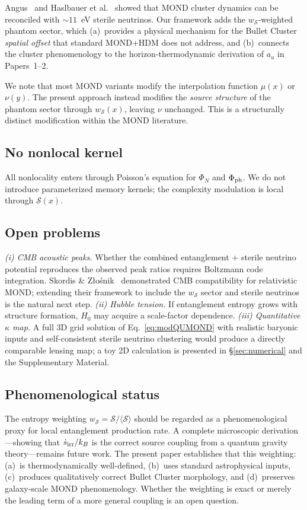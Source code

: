 \documentclass[aps,prd,twocolumn,superscriptaddress,nofootinbib]{revtex4-2}
\newcommand{\au}{a_u}
\newcommand{\Ph}{\Phi_{\rm ph}}
\newcommand{\PN}{\Phi_{N}}
\newcommand{\wS}{w_{\mathcal{S}}}
\newcommand{\Ssrc}{\mathcal{S}}
\begin{document}
Angus~\cite{Angus2009} and Haslbauer et al.~\cite{Haslbauer2020} showed that MOND cluster dynamics can be reconciled with $\sim 11$~eV sterile neutrinos. Our framework adds the $\wS$-weighted phantom sector, which (a)~provides a physical mechanism for the Bullet Cluster \emph{spatial offset} that standard MOND+HDM does not address, and (b)~connects the cluster phenomenology to the horizon-thermodynamic derivation of $\au$ in Papers~1--2.

We note that most MOND variants modify the interpolation function $\mu(x)$ or $\nu(y)$. The present approach instead modifies the \emph{source structure} of the phantom sector through $\wS(x)$, leaving $\nu$ unchanged. This is a structurally distinct modification within the MOND literature.

\subsection{No nonlocal kernel}

All nonlocality enters through Poisson's equation for $\PN$ and $\Ph$. We do not introduce parameterized memory kernels; the complexity modulation is local through $\Ssrc(x)$.

\subsection{Open problems}

\textit{(i) CMB acoustic peaks.} Whether the combined entanglement + sterile neutrino potential reproduces the observed peak ratios requires Boltzmann code integration. Skordis \& Z\l{}o\'snik~\cite{Skordis2021} demonstrated CMB compatibility for relativistic MOND; extending their framework to include the $\wS$ sector and sterile neutrinos is the natural next step. \textit{(ii) Hubble tension.} If entanglement entropy grows with structure formation, $H_0$ may acquire a scale-factor dependence. \textit{(iii) Quantitative $\kappa$ map.} A full 3D grid solution of Eq.~\eqref{eq:modQUMOND} with realistic baryonic inputs and self-consistent sterile neutrino clustering would produce a directly comparable lensing map; a toy 2D calculation is presented in \S\ref{sec:numerical} and the Supplementary Material.

\subsection{Phenomenological status}

The entropy weighting $\wS=\Ssrc/\langle\Ssrc\rangle$ should be regarded as a phenomenological proxy for local entanglement production rate. A complete microscopic derivation---showing that $\dot{s}_{\rm irr}/k_B$ is the correct source coupling from a quantum gravity theory---remains future work. The present paper establishes that this weighting: (a)~is thermodynamically well-defined, (b)~uses standard astrophysical inputs, (c)~produces qualitatively correct Bullet Cluster morphology, and (d)~preserves galaxy-scale MOND phenomenology. Whether the weighting is exact or merely the leading term of a more general coupling is an open question.
\end{document}
